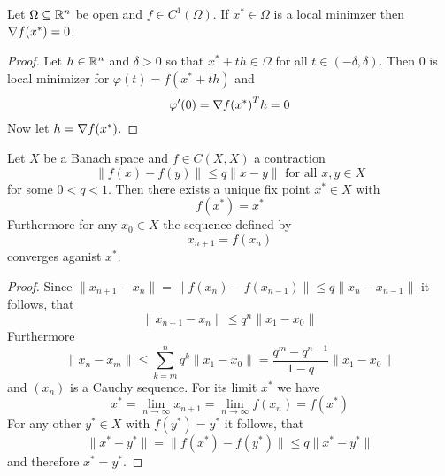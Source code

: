 \begin{theorem}\label{thm:fonc}
    Let \( \Omega \subseteq \mathbb{R}^n \) be open and \( f \in C^1(\Omega) \). If \( x^* \in \Omega \) is a local minimzer then
    \( \nabla f(x^*) = 0 \).
\end{theorem}

\begin{proof}
    Let \( h \in \mathbb{R}^n \) and \( \delta > 0 \) so that \( x^* + th \in \Omega \) for all \( t \in (-\delta, \delta) \).
    Then \( 0 \) is local minimizer for \( \varphi(t) = f(x^* + th) \) and
    \[
        \varphi'(0) = {\nabla f(x^*)}^T h = 0
    \]
    Now let \( h = \nabla f(x^*) \).
\end{proof}
\bigskip


\begin{theorem}\label{thm:banach_fix_point}
    Let \( X \) be a Banach space and \( f \in C(X,X) \) a contraction
    \[
        \|f(x) - f(y)\| \le q \|x - y\| \text{ for all } x, y \in X
    \]
    for some \( 0 < q < 1 \). Then there exists a unique fix point \( x^* \in X \) with
    \[
        f(x^*) = x^*
    \]
    Furthermore for any \( x_0 \in X \) the sequence defined by
    \[
        x_{n+1} = f(x_n)
    \]
    converges aganist \( x^* \).
\end{theorem}

\begin{proof}
    Since \( \| x_{n+1} - x_n\| =\| f(x_n) - f(x_{n-1})\| \le q\| x_n - x_{n-1}\| \) it follows, that
    \[
        \| x_{n+1} - x_n\| \le q^n  \|x_1 - x_0\|
    \]
    Furthermore
    \[
        \| x_n - x_m\| \le \sum_{k=m}^n q^k \|x_1 - x_0\| = \frac{q^m - q^{n+1}}{1 - q} \|x_1 - x_0\|
    \]
    and \( (x_n) \) is a Cauchy sequence. For its limit \( x^* \) we have
    \[
        x^* = \lim_{n\to\infty} x_{n+1} = \lim_{n\to\infty} f(x_n) = f(x^*)
    \]
    For any other \( y^* \in X \) with \( f(y^*) = y^* \) it follows, that
    \[
        \|x^* - y^*\| = \|f(x^*) - f(y^*)\| \le q \|x^* - y^*\|
    \]
    and therefore \( x^* = y^*\).

\end{proof}
\bigskip

